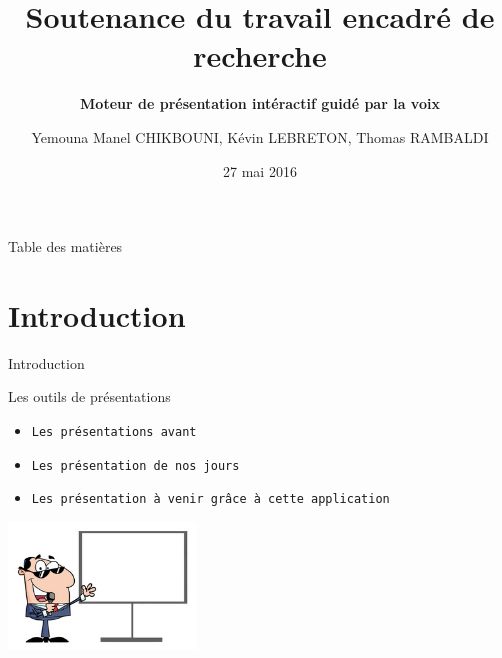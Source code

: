\documentclass[10pt]{beamer}
\title[] %
{ %
      \textbf{Soutenance du travail encadré de recherche}
}
\subtitle[Moteur de présentation intéractif guidé par la voix]
{
	\textbf{Moteur de présentation intéractif guidé par la voix}
}
\author[Yemouna Manel CHIKBOUNI, Kévin LEBRETON, Thomas RAMBALDI]
{      Yemouna Manel CHIKBOUNI, Kévin LEBRETON, Thomas RAMBALDI
}
\institute[]
{
	Faculté des sciences de Luminy\\
	Université d'Aix-Marseille\\
	Master 1 informatique\\
  
}
\date{27 mai 2016}
\begin{document}

{\1%
\begin{frame}
  \titlepage
\end{frame}


\begin{frame}{Table des matières}
	\tableofcontents
\end{frame}
}

\section{Introduction}
\begin{frame}{Introduction}
	\begin{block}{Les outils de présentations}	
		\begin{itemize}
			\item {\tt Les présentations avant}
			\item {\tt Les présentation de nos jours}
			\item {\tt Les présentation à venir grâce à cette application}
		\end{itemize}
	\end{block}
	\begin{center}
    	 \includegraphics[width=5cm]{./images/presentation_voix}
	\end{center}
\end{frame}
\end{document}
